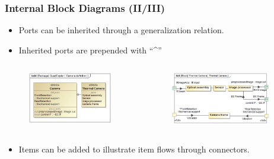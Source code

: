 \documentclass[xcolor=dvipsnames,t]{beamer}
\newcommand\fixmegood[1]{\textcolor{red}{#1}}
\begin{document}
\begin{frame}
\frametitle {Internal Block Diagrams (II/III)}

\begin{itemize}
\item Ports can be inherited through a generalization relation.	
\item Inherited ports are prepended with ``\textasciicircum''
\end{itemize}

\begin{columns}
	\begin{column}{0.4\textwidth}
		\begin{figure}
		 	\includegraphics[width=\textwidth]{CameraAndThermalCam.jpg}
		\end{figure}
	\end{column}
	
	\begin{column}{0.6\textwidth}
		\begin{figure}
		 	\includegraphics[width=0.9\textwidth]{IBDThermalCamera.jpg}
		\end{figure}
	\end{column}
\end{columns}

\begin{itemize}
\item Items can be added to illustrate item flows through connectors.
\end{itemize}


\end{frame}
\end{document}
